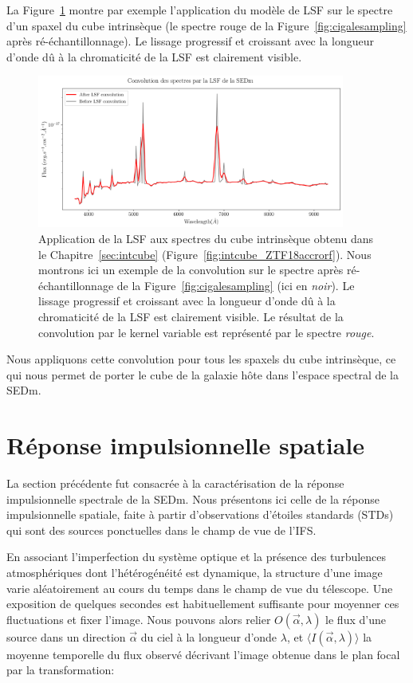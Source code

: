 \documentclass[../main/main.tex]{subfiles}
\begin{document}
La Figure~\ref{fig:lsfapplied} montre par exemple l'application du
modèle de LSF sur le spectre d'un spaxel du cube intrinsèque (le spectre
rouge de la Figure~\ref{fig:cigalesampling} après
ré-échantillonnage). Le lissage progressif et croissant avec la
longueur d'onde dû à la chromaticité de la LSF est
clairement visible.

\begin{figure}[h!]
  \centering
  \includegraphics[width=0.9\textwidth]{../figures/06_irf/lsfapplied.png}
  \caption[Application de la LSF]{Application de la LSF aux spectres du
    cube intrinsèque obtenu dans le Chapitre~\ref{sec:intcube}
    (Figure~\ref{fig:intcube_ZTF18accrorf}). Nous montrons ici un exemple
    de la convolution sur le spectre après ré-échantillonnage de la
    Figure~\ref{fig:cigalesampling} (ici en \textit{noir}). Le lissage progressif et croissant avec la
longueur d'onde dû à la chromaticité de la LSF est
clairement visible. Le résultat de la convolution par le kernel variable
est représenté par le spectre \textit{rouge}.}
  \label{fig:lsfapplied}
\end{figure}

Nous appliquons cette convolution pour tous les spaxels du cube
intrinsèque, ce qui nous permet de porter le cube de la galaxie hôte dans l'espace
spectral de la SEDm.
\clearpage

\section{Réponse impulsionnelle spatiale}\label{sec:psf}

La section précédente fut consacrée à la caractérisation de la réponse
impulsionnelle spectrale de la SEDm. Nous présentons ici celle de la
réponse impulsionnelle spatiale, faite à partir d'observations d'étoiles standards (STDs) qui
sont des sources ponctuelles dans le champ de vue de l'IFS.

En associant l'imperfection du système optique et la présence des
turbulences atmosphériques \citep{Kolmogorov} dont l'hétérogénéité est dynamique, la structure d'une image
varie aléatoirement au cours du temps dans le champ de vue du
télescope. Une exposition de quelques secondes est habituellement
suffisante pour moyenner ces fluctuations et fixer l'image. Nous
pouvons alors relier  $O(\vec{\alpha},\lambda)$ le flux d'une source dans un direction $\vec{\alpha}$ du
ciel à la longueur d'onde $\lambda$, et $\langle
I(\vec{\alpha},\lambda)\rangle$ la moyenne temporelle du flux observé
décrivant l'image obtenue dans le plan focal par la
transformation:
\end{document}
